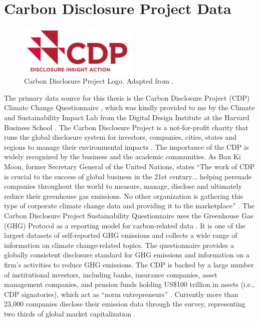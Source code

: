 \section{Carbon Disclosure Project Data}
\begin{figure}[H]
    \centering
    \includegraphics[width=0.5\textwidth]{figures/cdp_logo.png}
    \caption{Carbon Disclosure Project Logo. Adapted from \cite{CDPMain2024}.}
    \label{fig:my_label}
\end{figure}

The primary data source for this thesis is the Carbon Disclosure Project (CDP) Climate Change Questionnaire \cite{CDP2024}, which was kindly provided to me by the Climate and Sustainability Impact Lab from the Digital Design Institute at the Harvard Business School \cite{HarvardD3Lab2024}. The Carbon Disclosure Project is a not-for-profit charity that runs the global disclosure system for investors, companies, cities, states and regions to manage their environmental impacts \cite{CDPMain2024}. The importance of the CDP is widely recognized by the business and the academic communities. As Ban Ki Moon, former Secretary General of the United Nations, states ``The work of CDP is crucial to the success of global business in the 21st century... helping persuade companies throughout the world to measure, manage, disclose and ultimately reduce their greenhouse gas emissions. No other organization is gathering this type of corporate climate change data and providing it to the marketplace'' \cite{CDPMain2024}. The Carbon Disclosure Project Sustainability Questionnaire uses the Greenhouse Gas (GHG) Protocol as a reporting model for carbon-related data \cite{Andrew2011Accounting}. It is one of the largest datasets of self-reported GHG emissions and collects a wide range of information on climate change-related topics. The questionnaire provides a globally consistent disclosure standard for GHG emissions and information on a firm’s activities to reduce GHG emissions. The CDP is backed by a large number of institutional investors, including banks, insurance companies, asset management companies, and pension funds holding US\$100 trillion in assets (i.e., CDP signatories), which act as ``norm entrepreneurs'' \cite{OTT201714}. Currently more than 23,000 companies disclose their emission data through the survey, representing two thirds of global market capitalization \cite{CDPMain2024}. 

